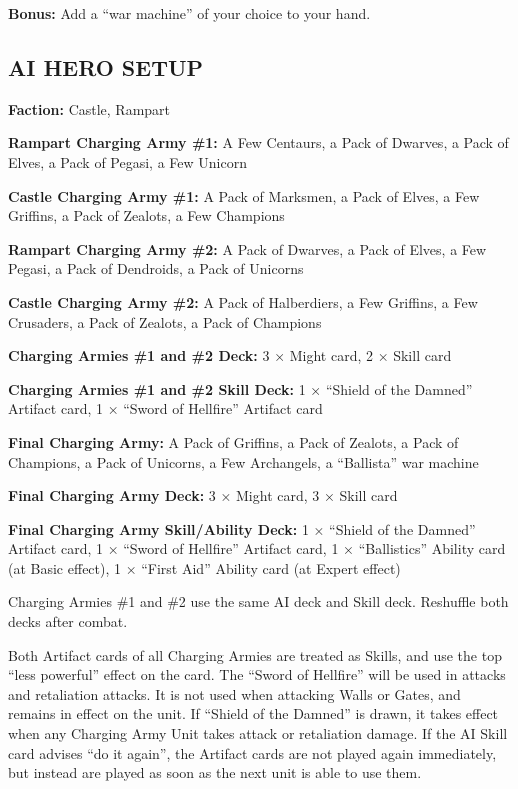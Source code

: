 \begin{multicols*}{2}
\textbf{Bonus:} Add a ``war machine'' of your choice to your hand.

\subsection*{\MakeUppercase{AI hero setup}}

\textbf{Faction:} Castle, Rampart

\textbf{Rampart Charging Army \#1:} A Few Centaurs, a Pack of Dwarves, a Pack of Elves, a Pack of Pegasi, a Few Unicorn

\textbf{Castle Charging Army \#1:} A Pack of Marksmen, a Pack of Elves, a Few Griffins, a Pack of Zealots, a Few Champions

\textbf{Rampart Charging Army \#2:} A Pack of Dwarves, a Pack of Elves, a Few Pegasi, a Pack of Dendroids, a Pack of Unicorns

\textbf{Castle Charging Army \#2:} A Pack of Halberdiers, a Few Griffins, a Few Crusaders, a Pack of Zealots, a Pack of Champions

\textbf{Charging Armies \#1 and \#2 Deck:} 3 × Might card, 2 × Skill card

\textbf{Charging Armies \#1 and \#2 Skill Deck:} 1 × ``Shield of the Damned'' Artifact card, 1 × ``Sword of Hellfire'' Artifact card

\textbf{Final Charging Army:} A Pack of Griffins, a Pack of Zealots, a Pack of Champions, a Pack of Unicorns, a Few Archangels, a ``Ballista'' war machine

\textbf{Final Charging Army Deck:} 3 × Might card, 3 × Skill card

\textbf{Final Charging Army Skill/Ability Deck:} 1 × ``Shield of the Damned'' Artifact card, 1 × ``Sword of Hellfire'' Artifact card,
  1 × ``Ballistics'' Ability card (at Basic effect), 1 × ``First Aid'' Ability card (at Expert effect)

Charging Armies \#1 and \#2 use the same AI deck and Skill deck. Reshuffle both decks after combat.

Both Artifact cards of all Charging Armies are treated as Skills, and use the top ``less powerful'' effect on the card.
The ``Sword of Hellfire'' will be used in attacks and retaliation attacks. It is not used when attacking Walls or Gates,
and remains in effect on the unit. If ``Shield of the Damned'' is drawn, it takes effect when
any Charging Army Unit takes attack or retaliation damage. If the AI Skill card advises ``do it again'', the Artifact
cards are not played again immediately, but instead are played as soon as the next unit is able to use them.


\end{multicols*}
